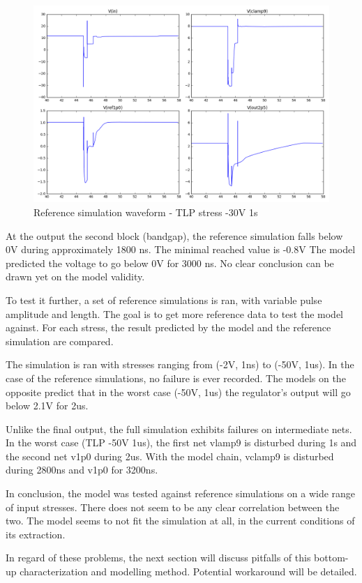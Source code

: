 \begin{figure}[]
  \centering
  \includegraphics[width=\textwidth]{src/4/figures/total_simulation.png}
  \caption{Reference simulation waveform - TLP stress -30V 1\textmugreek{}s }
  \label{fig:reference_simu}
\end{figure}

At the output the second block (bandgap), the reference simulation falls below 0V during approximately 1800 ns.
The minimal reached value is -0.8V
The model predicted the voltage to go below 0V for 3000 ns.
No clear conclusion can be drawn yet on the model validity.

To test it further, a set of reference simulations is ran, with variable pulse amplitude and length.
The goal is to get more reference data to test the model against.
For each stress, the result predicted by the model and the reference simulation are compared.

The simulation is ran with stresses ranging from (-2V, 1ns) to (-50V, 1us).
In the case of the reference simulations, no failure is ever recorded.
The models on the opposite predict that in the worst case (-50V, 1us) the regulator's output will go below 2.1V for 2us.

Unlike the final output, the full simulation exhibits failures on intermediate nets.
In the worst case (TLP -50V 1us), the first net vlamp9 is disturbed during 1\textmugreek{}s and the second net v1p0 during 2us.
With the model chain, vclamp9 is disturbed during 2800ns and v1p0 for 3200ns.

In conclusion, the model was tested against reference simulations on a wide range of input stresses.
There does not seem to be any clear correlation between the two.
The model seems to not fit the simulation at all, in the current conditions of its extraction.

In regard of these problems, the next section will discuss pitfalls of this bottom-up characterization and modelling method.
Potential workaround will be detailed.
